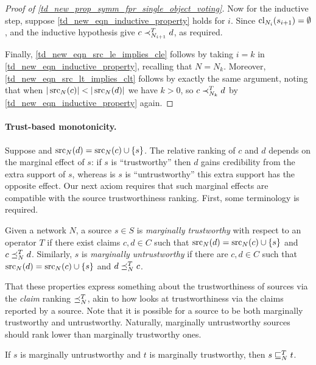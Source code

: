 \begin{proof}[Proof of \cref{td_new_prop_symm_fpr_single_object_voting}]
    Now for the inductive step, suppose \cref{td_new_eqn_inductive_property}
    holds for $i$. Since $\operatorname{cl}_{N_i}(s_{i + 1}) = \emptyset$,
    \freshposresp{} and the inductive hypothesis give $c \prec_{N_{i + 1}}^T d$,
    as required.

    Finally, \cref{td_new_eqn_src_le_implies_cle} follows by taking $i = k$ in
    \cref{td_new_eqn_inductive_property}, recalling that $N = N_k$. Moreover,
    \cref{td_new_eqn_src_lt_implies_clt} follows by exactly the same argument,
    noting that when $|\operatorname{src}_N(c)| < |\operatorname{src}_N(d)|$ we have $k > 0$, so $c
    \prec_{N_k}^T d$ by \cref{td_new_eqn_inductive_property} again.
\end{proof}

\paragraph{Trust-based monotonicity.}

Suppose and $\operatorname{src}_N(d) = \operatorname{src}_N(c) \cup \{s\}$. The relative ranking of $c$ and
$d$ depends on the marginal effect of $s$: if $s$ is ``trustworthy'' then $d$
gains credibility from the extra support of $s$, whereas is $s$ is
``untrustworthy'' this extra support has the opposite effect. Our next axiom
requires that such marginal effects are compatible with the source
trustworthiness ranking. First, some terminology is required.

\begin{definition}
    Given a network $N$, a source $s \in S$ is \emph{marginally trustworthy}
    with respect to an operator $T$ if there exist claims $c, d \in C$ such
    that $\operatorname{src}_N(d) = \operatorname{src}_N(c) \cup \{s\}$ and $c \preceq_N^T d$.
    Similarly, $s$ is \emph{marginally untrustworthy} if there are $c, d  \in
    C$ such that $\operatorname{src}_N(d) = \operatorname{src}_N(c) \cup \{s\}$ and $d \preceq_N^T c$.
\end{definition}

That these properties express something about the trustworthiness of sources
via the \emph{claim} ranking $\preceq_N^T$, akin to how \sourcecoherence{} looks
at trustworthiness via the claims reported by a source. Note that it is
possible for a source to be both marginally trustworthy and untrustworthy.
Naturally, marginally untrustworthy sources should rank lower than marginally
trustworthy ones.

\begin{axiom}[\marginaltrustworthiness{}]
    If $s$ is marginally untrustworthy and $t$ is marginally trustworthy, then
    $s \sqsubseteq_N^T t$.
\end{axiom}

